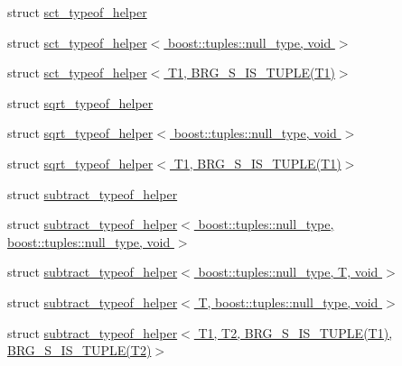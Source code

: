 \begin{DoxyCompactItemize}
\item 
struct \hyperlink{namespaceIceBRG_1_1tuples_structIceBRG_1_1tuples_1_1sct__typeof__helper}{sct\+\_\+typeof\+\_\+helper}
\item 
struct \hyperlink{namespaceIceBRG_1_1tuples_structIceBRG_1_1tuples_1_1sct__typeof__helper_3_01boost_1_1tuples_1_1null__type_00_01void_01_4}{sct\+\_\+typeof\+\_\+helper$<$ boost\+::tuples\+::null\+\_\+type, void $>$}
\item 
struct \hyperlink{namespaceIceBRG_1_1tuples_structIceBRG_1_1tuples_1_1sct__typeof__helper_3_01T1_00_01BRG__S__IS__TUPLE_07T1_08_4}{sct\+\_\+typeof\+\_\+helper$<$ T1, B\+R\+G\+\_\+\+S\+\_\+\+I\+S\+\_\+\+T\+U\+P\+L\+E(\+T1)$>$}
\item 
struct \hyperlink{namespaceIceBRG_1_1tuples_structIceBRG_1_1tuples_1_1sqrt__typeof__helper}{sqrt\+\_\+typeof\+\_\+helper}
\item 
struct \hyperlink{namespaceIceBRG_1_1tuples_structIceBRG_1_1tuples_1_1sqrt__typeof__helper_3_01boost_1_1tuples_1_1null__type_00_01void_01_4}{sqrt\+\_\+typeof\+\_\+helper$<$ boost\+::tuples\+::null\+\_\+type, void $>$}
\item 
struct \hyperlink{namespaceIceBRG_1_1tuples_structIceBRG_1_1tuples_1_1sqrt__typeof__helper_3_01T1_00_01BRG__S__IS__TUPLE_07T1_08_4}{sqrt\+\_\+typeof\+\_\+helper$<$ T1, B\+R\+G\+\_\+\+S\+\_\+\+I\+S\+\_\+\+T\+U\+P\+L\+E(\+T1)$>$}
\item 
struct \hyperlink{namespaceIceBRG_1_1tuples_structIceBRG_1_1tuples_1_1subtract__typeof__helper}{subtract\+\_\+typeof\+\_\+helper}
\item 
struct \hyperlink{namespaceIceBRG_1_1tuples_structIceBRG_1_1tuples_1_1subtract__typeof__helper_3_01boost_1_1tuples_1_1null__type_00_01boost_80010c4fbaf3d761a5da3d020e0023b6}{subtract\+\_\+typeof\+\_\+helper$<$ boost\+::tuples\+::null\+\_\+type, boost\+::tuples\+::null\+\_\+type, void $>$}
\item 
struct \hyperlink{namespaceIceBRG_1_1tuples_structIceBRG_1_1tuples_1_1subtract__typeof__helper_3_01boost_1_1tuples_1_1null__type_00_01T_00_01void_01_4}{subtract\+\_\+typeof\+\_\+helper$<$ boost\+::tuples\+::null\+\_\+type, T, void $>$}
\item 
struct \hyperlink{namespaceIceBRG_1_1tuples_structIceBRG_1_1tuples_1_1subtract__typeof__helper_3_01T_00_01boost_1_1tuples_1_1null__type_00_01void_01_4}{subtract\+\_\+typeof\+\_\+helper$<$ T, boost\+::tuples\+::null\+\_\+type, void $>$}
\item 
struct \hyperlink{namespaceIceBRG_1_1tuples_structIceBRG_1_1tuples_1_1subtract__typeof__helper_3_01T1_00_01T2_00_01BRG__S__IS__TUPLE_07T1_08c8e4888bfd8d316092f0dc03c7128272}{subtract\+\_\+typeof\+\_\+helper$<$ T1, T2, B\+R\+G\+\_\+\+S\+\_\+\+I\+S\+\_\+\+T\+U\+P\+L\+E(\+T1), B\+R\+G\+\_\+\+S\+\_\+\+I\+S\+\_\+\+T\+U\+P\+L\+E(\+T2)$>$}

\end{DoxyCompactItemize}
